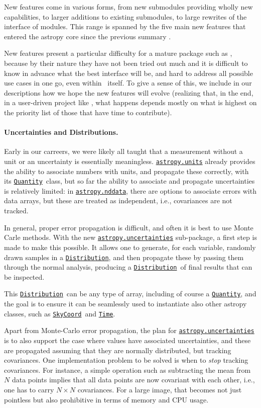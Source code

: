 \documentclass[modern]{aastex631}
\newcommand{\astropysubpkg}[1]{\href{http://docs.astropy.org/en/stable/#1/index.html}{\texttt{astropy.#1}}\xspace}
\newcommand{\astropyunits}{\astropysubpkg{units}}
\newcommand{\astropyapi}[2]{\href{https://docs.astropy.org/en/stable/api/astropy.#1.html}{#2}}
\newcommand{\astropyapidoc}[2]{\astropyapi{#1}{\texttt{#2}\xspace}}
\newcommand{\astropySkyCoord}{\astropyapidoc{coordinates.SkyCoord}{SkyCoord}}
\newcommand{\astropyTime}{\astropyapidoc{time.Time}{Time}}
\newcommand{\astropyDistribution}{\astropyapidoc{uncertainty.Distribution}{Distribution}}
\newcommand{\astropyQuantity}{\astropyapidoc{units.Quantity}{Quantity}}
\begin{document}
New features come in various forms, from new submodules providing
wholly new capabilities, to larger additions to existing submodules,
to large rewrites of the interface of modules.  This range is spanned
by the five main new features that entered the astropy core since the
previous summary .

New features present a particular difficulty for a mature package such
as \astropypkg, because by their nature they have not been tried out
much and it is difficult to know in advance what the best interface
will be, and hard to address all possible use cases in one go, even
within \astropypkg\ itself.  To give a sense of this, we include in
our descriptions how we hope the new features will evolve (realizing
that, in the end, in a user-driven project like \astropy, what happens
depends mostly on what is highest on the priority list of those that
have time to contribute).

\paragraph{Uncertainties and Distributions.} Early in our carreers, we
were likely all taught that a measurement without a unit or an
uncertainty is essentially meaningless.  \astropyunits already
provides the ability to associate numbers with units, and propagate
these correctly, with its \astropyQuantity\ class, but so far the
ability to associate and propagate uncertainties is relatively
limited: in \astropysubpkg{nddata}, there are options to associate
errors with data arrays, but these are treated as independent, i.e.,
covariances are not tracked.

In general, proper error propagation is difficult, and often it is
best to use Monte Carle methods.  With the new
\astropysubpkg{uncertainties} sub-package, a first step is made to
make this possible.  It allows one to generate, for each variable,
randomly drawn samples in a \astropyDistribution, and then propagate
these by passing them through the normal analysis, producing a
\astropyDistribution\ of final results that can be inspected.

This \astropyDistribution\ can be any type of array, including of
course a \astropyQuantity, and the goal is to ensure it can be
seamlessly used to instantiate also other astropy classes, such as
\astropySkyCoord\ and \astropyTime.

Apart from Monte-Carlo error propagation, the plan for
\astropysubpkg{uncertainties} is to also support the case where values
have associated uncertainties, and these are propagated assuming that
they are normally distributed, but tracking covariances.  One
implementation problem to be solved is when to {\em stop} tracking
covariances.  For instance, a simple operation such as subtracting the
mean from $N$ data points implies that all data points are now
covariant with each other, i.e., one has to carry $N\times N$
covariances.  For a large image, that becomes not just pointless but
also prohibitive in terms of memory and CPU usage.
\end{document}
